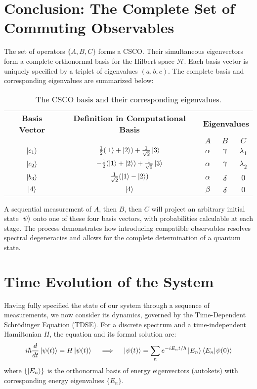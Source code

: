 \documentclass[11pt,a4paper]{article}
\begin{document}
\section{Conclusion: The Complete Set of Commuting Observables}
The set of operators $\{A, B, C\}$ forms a CSCO. Their simultaneous eigenvectors
form a complete orthonormal basis for the Hilbert space $\mathcal{H}$. Each
basis vector is uniquely specified by a triplet of eigenvalues $(a,b,c)$. The
complete basis and corresponding eigenvalues are summarized below:

\begin{table}[h!]
  \centering
  \begin{tabular}{c|c|ccc}
    \hline\hline
    \textbf{Basis Vector} & \textbf{Definition in Computational Basis} &
    \multicolumn{3}{c}{\textbf{Eigenvalues}} \\
                          & & $A$ & $B$ & $C$ \\
                          \hline
    $\ket{c_1}$ & $\frac{1}{2}(\ket{1}+\ket{2}) + \frac{1}{\sqrt{2}}\ket{3}$ & $\alpha$ & $\gamma$ & $\lambda_1$ \\
    $\ket{c_2}$ & $-\frac{1}{2}(\ket{1}+\ket{2}) + \frac{1}{\sqrt{2}}\ket{3}$ & $\alpha$ & $\gamma$ & $\lambda_2$ \\
    $\ket{b_3}$ & $\frac{1}{\sqrt{2}}(\ket{1}-\ket{2})$ & $\alpha$ & $\delta$ & $0$ \\
    $\ket{4}$ & $\ket{4}$ & $\beta$ & $\delta$ & $0$ \\
    \hline\hline
  \end{tabular}
  \caption{The CSCO basis and their corresponding eigenvalues.}
  \label{tab:csco_basis}
\end{table}

A sequential measurement of $A$, then $B$, then $C$ will project an arbitrary
initial state $\ket{\psi}$ onto one of these four basis vectors, with
probabilities calculable at each stage. The process demonstrates how introducing
compatible observables resolves spectral degeneracies and allows for the
complete determination of a quantum state.

\section{Time Evolution of the System}

Having fully specified the state of our system through a sequence of
measurements, we now consider its dynamics, governed by the Time-Dependent
Schrödinger Equation (TDSE). For a discrete spectrum and a time-independent
Hamiltonian $H$, the equation and its formal solution are:
$$
i\hbar \frac{d}{dt}\ket{\psi(t)} = H \ket{\psi(t)} \quad \implies \quad
\ket{\psi(t)} = \sum_n e^{-iE_n t/\hbar} \ket{E_n}\braket{E_n}{\psi(0)}
$$
where $\{\ket{E_n}\}$ is the orthonormal basis of energy eigenvectors (autokets)
with corresponding energy eigenvalues $\{E_n\}$.
\end{document}

